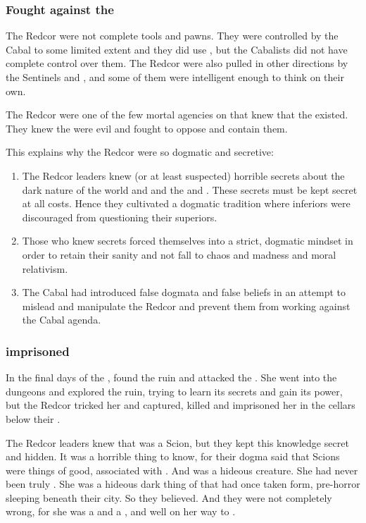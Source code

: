 \subsubsection{Fought against the \banes}
The Redcor were not complete tools and pawns. 
They were controlled by the Cabal to some limited extent and they did use \iquin, but the Cabalists did not have complete control over them.
The Redcor were also pulled in other directions by the Sentinels and \Kezerad, and some of them were intelligent enough to think on their own. 

The Redcor were one of the few mortal agencies on \Azmith that knew that the \banes existed. 
They knew the \banes were evil and fought to oppose and contain them. 

This explains why the Redcor were so dogmatic and secretive:

\begin{enumerate}
  \item 
    The Redcor leaders knew (or at least suspected) horrible secrets about the dark nature of the world and \humankind and the \sephiroth and \qliphoth. 
    These secrets must be kept secret at all costs.
    Hence they cultivated a dogmatic tradition where inferiors were discouraged from questioning their superiors.
  \item 
    Those who knew secrets forced themselves into a strict, dogmatic mindset in order to retain their sanity and not fall to chaos and madness and moral relativism.
  \item 
    The Cabal had introduced false dogmata and false beliefs in an attempt to mislead and manipulate the Redcor and prevent them from working against the Cabal agenda. 
\end{enumerate}





\subsubsection{\Belzir imprisoned}
In the final days of the \VaimonCaliphate, \Belzir found the ruin and attacked the \Chateau. 
She went into the dungeons and explored the ruin, trying to learn its secrets and gain its power, but the Redcor tricked her and captured, killed and imprisoned her in the cellars below their \Chateau. 

The Redcor leaders knew that \Belzir was a Scion, but they kept this knowledge secret and hidden. 
It was a horrible thing to know, for their dogma said that Scions were things of good, associated with \iquin. 
And \Belzir was a hideous creature. 
She had never been truly \human. 
She was a hideous dark thing of \itzach that had once taken \human form, pre-\human horror sleeping beneath their city. 
So they believed.
And they were not completely wrong, for she was a \sathariah and a \malach, and well on her way to . 





